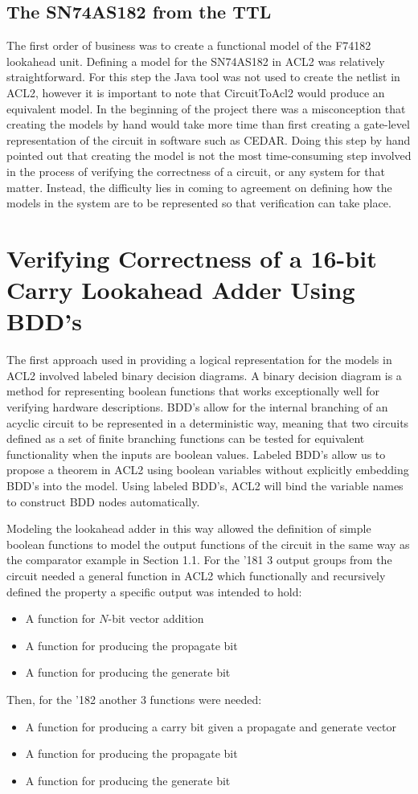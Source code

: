 \documentclass[fleqn,10pt]{SelfArx} %
\begin{document}
\subsection{The SN74AS182 from the TTL}
The first order of business was to create a functional model of the F74182 lookahead unit. Defining a model for the SN74AS182 in ACL2 was relatively straightforward. For this step the Java tool was not used to create the netlist in ACL2, however it is important to note that CircuitToAcl2 would produce an equivalent model. In the beginning of the project there was a misconception that creating the models by hand would take more time than first creating a gate-level representation of the circuit in software such as CEDAR. Doing this step by hand pointed out that creating the model is not the most time-consuming step involved in the process of verifying the correctness of a circuit, or any system for that matter. Instead, the difficulty lies in coming to agreement on defining how the models in the system are to be represented so that verification can take place. 

\section{Verifying Correctness of a 16-bit Carry Lookahead Adder Using BDD's}
The first approach used in providing a logical representation for the models in ACL2 involved labeled binary decision diagrams. A binary decision diagram is a method for representing boolean functions that works exceptionally well for verifying hardware descriptions\cite{bdd}. BDD's allow for the internal branching of an acyclic circuit to be represented in a deterministic way, meaning that two circuits defined as a set of finite branching functions can be tested for equivalent functionality when the inputs are boolean values. Labeled BDD's allow us to propose a theorem in ACL2 using boolean variables without explicitly embedding BDD's into the model. Using labeled BDD's, ACL2 will bind the variable names to construct BDD nodes automatically. 

Modeling the lookahead adder in this way allowed the definition of simple boolean functions to model the output functions of the circuit in the same way as the comparator example in Section 1.1. For the '181 3 output groups from the circuit needed a general function in ACL2 which functionally and recursively defined the property a specific output was intended to hold:
\begin{itemize}
\item A function for $N$-bit vector addition
\item A function for producing the propagate bit
\item A function for producing the generate bit
\end{itemize}
Then, for the '182 another 3 functions were needed:
\begin{itemize}
\item A function for producing a carry bit given a propagate and generate vector
\item A function for producing the propagate bit
\item A function for producing the generate bit
\end{itemize}
\end{document}
